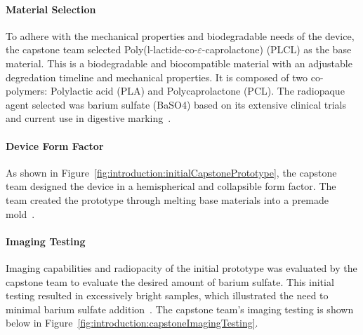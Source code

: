 \paragraph*{Material Selection\label{sec:introduction:priorWork:seniorCapstone:initialPrototypeDevelopment:materialSelection}}
To adhere with the mechanical properties and biodegradable needs of the device, the capstone team selected Poly(l-lactide-co-$\varepsilon$-caprolactone) (PLCL) as the base material. This is a biodegradable and biocompatible material with an adjustable degredation timeline and mechanical properties. It is composed of two co-polymers: Polylactic acid (PLA) and Polycaprolactone (PCL). The radiopaque agent selected was barium sulfate (BaSO4) based on its extensive clinical trials and current use in digestive marking~\cite{RefWorks:RefID:372-krakovskytumor}.

\paragraph*{Device Form Factor\label{sec:introduction:priorWork:seniorCapstone:initialPrototypeDevelopment:formFactor}}
As shown in Figure~\ref{fig:introduction:initialCapstonePrototype}, the capstone team designed the device in a hemispherical and collapsible form factor. The team created the prototype through melting base materials into a premade mold~\cite{RefWorks:RefID:372-krakovskytumor}.

\paragraph*{Imaging Testing\label{sec:introduction:priorWork:seniorCapstone:initialPrototypeDevelopment:imaginTesting}}

Imaging capabilities and radiopacity of the initial prototype was evaluated by the capstone team to evaluate the desired amount of barium sulfate. This initial testing resulted in excessively bright samples, which illustrated the need to minimal barium sulfate addition~\cite{RefWorks:RefID:372-krakovskytumor}. The capstone team's imaging testing is shown below in Figure~\ref{fig:introduction:capstoneImagingTesting}.

